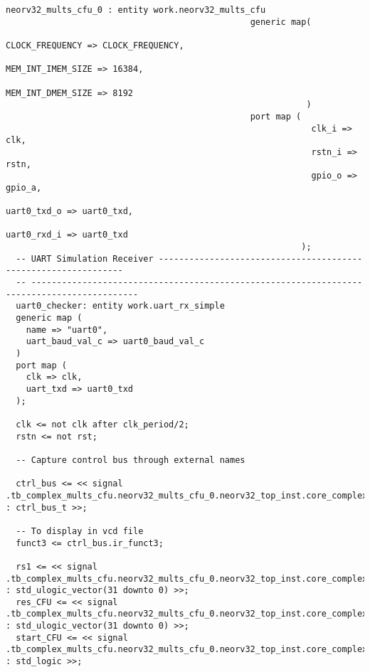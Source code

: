 \begin{code}
\begin{verbatim}
neorv32_mults_cfu_0 : entity work.neorv32_mults_cfu
                                                generic map(
                                                            CLOCK_FREQUENCY => CLOCK_FREQUENCY,
                                                            MEM_INT_IMEM_SIZE => 16384,
                                                            MEM_INT_DMEM_SIZE => 8192
                                                           )
                                                port map (
                                                            clk_i => clk,
                                                            rstn_i => rstn,
                                                            gpio_o => gpio_a,
                                                            uart0_txd_o => uart0_txd,
                                                            uart0_rxd_i => uart0_txd
                                                          );
  -- UART Simulation Receiver ---------------------------------------------------------------
  -- -------------------------------------------------------------------------------------------
  uart0_checker: entity work.uart_rx_simple
  generic map (
    name => "uart0",
    uart_baud_val_c => uart0_baud_val_c
  )
  port map (
    clk => clk,
    uart_txd => uart0_txd
  );

  clk <= not clk after clk_period/2;
  rstn <= not rst;

  -- Capture control bus through external names

  ctrl_bus <= << signal .tb_complex_mults_cfu.neorv32_mults_cfu_0.neorv32_top_inst.core_complex.neorv32_cpu_inst.neorv32_cpu_alu_inst.neorv32_cpu_cp_cfu_inst_true.neorv32_cpu_cp_cfu_inst.ctrl_i : ctrl_bus_t >>;

  -- To display in vcd file 
  funct3 <= ctrl_bus.ir_funct3;

  rs1 <= << signal .tb_complex_mults_cfu.neorv32_mults_cfu_0.neorv32_top_inst.core_complex.neorv32_cpu_inst.neorv32_cpu_alu_inst.neorv32_cpu_cp_cfu_inst_true.neorv32_cpu_cp_cfu_inst.rs1_i : std_ulogic_vector(31 downto 0) >>;
  res_CFU <= << signal .tb_complex_mults_cfu.neorv32_mults_cfu_0.neorv32_top_inst.core_complex.neorv32_cpu_inst.neorv32_cpu_alu_inst.neorv32_cpu_cp_cfu_inst_true.neorv32_cpu_cp_cfu_inst.res_o : std_ulogic_vector(31 downto 0) >>;
  start_CFU <= << signal .tb_complex_mults_cfu.neorv32_mults_cfu_0.neorv32_top_inst.core_complex.neorv32_cpu_inst.neorv32_cpu_alu_inst.neorv32_cpu_cp_cfu_inst_true.neorv32_cpu_cp_cfu_inst.start_i : std_logic >>;


\end{verbatim}
\end{code}
